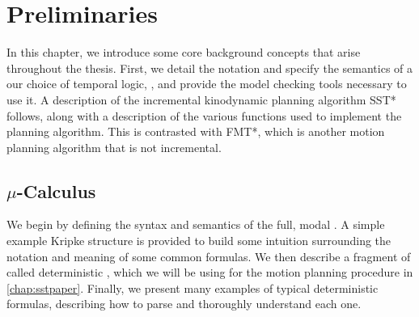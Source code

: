 \chapter{Preliminaries}\label{chap:prelims}

In this chapter, we introduce some core background concepts that arise throughout the thesis. First, we detail the notation and specify the semantics of a our choice of temporal logic, \mucalc{}, and provide the model checking tools necessary to use it. A description of the incremental kinodynamic planning algorithm SST* follows, along with a description of the various functions used to implement the planning algorithm. This is contrasted with FMT*, which is another motion planning algorithm that is not incremental.


\section{\texorpdfstring{$\mu$-Calculus}{mu-Calculus}}

We begin by defining the syntax and semantics of the full, modal \mucalc{}. A simple example Kripke structure is provided to build some intuition surrounding the notation and meaning of some common \mucalc{} formulas. We then describe a fragment of \mucalc{} called deterministic \mucalc{}, which we will be using for the motion planning procedure in \autoref{chap:sstpaper}. Finally, we present many examples of typical deterministic \mucalc{} formulas, describing how to parse and thoroughly understand each one.




